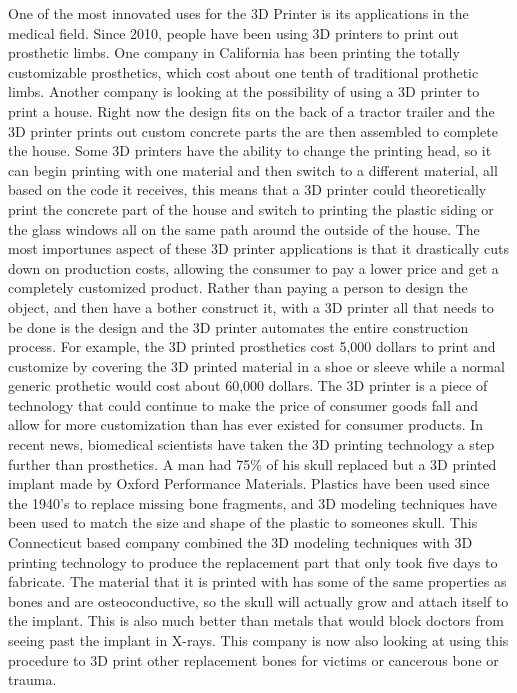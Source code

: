 \documentclass[12pt,twocolumn]{article}
\begin{document}
\indent	One of the most innovated uses for the 3D Printer is its applications in the medical field. Since 2010, people have been using 3D printers to print out prosthetic limbs. One company in California has been printing the totally customizable prosthetics, which cost about one tenth of traditional prothetic limbs. Another company is looking at the possibility of using a 3D printer to print a house. Right now the design fits on the back of a tractor trailer and the 3D printer prints out custom concrete parts the are then assembled to complete the house. Some 3D printers have the ability to change the printing head, so it can begin printing with one material and then switch to a different material, all based on the code it receives, this means that a 3D printer could theoretically print the concrete part of the house and switch to printing the plastic siding or the glass windows all on the same path around the outside of the house. The most importunes aspect of these 3D printer applications is that it drastically cuts down on production costs, allowing the consumer to pay a lower price and get a completely customized product. Rather than paying a person to design the object, and then have a bother construct it, with a 3D printer all that needs to be done is the design and the 3D printer automates the entire construction process. For example, the 3D printed prosthetics cost 5,000 dollars to print and customize by covering the 3D printed material in a shoe or sleeve while a normal generic prothetic would cost about 60,000 dollars.\cite{cite5} The 3D printer is a piece of technology that could continue to make the price of consumer goods fall and allow for more customization than has ever existed for consumer products.
 \indent In recent news, biomedical scientists have taken the 3D printing technology a step further than prosthetics. A man had 75\% of his skull replaced but a 3D printed implant made by Oxford Performance Materials. Plastics have been used since the 1940's to replace missing bone fragments, and 3D modeling techniques have been used to match the size and shape of the plastic to someones skull. This Connecticut based company combined the 3D modeling techniques with 3D printing technology to produce the replacement part that only took five days to fabricate.\cite{cite9} The material that it is printed with has some of the same properties as bones and are osteoconductive, so the skull will actually grow and attach itself to the implant. This is also much better than metals that would block doctors from seeing past the implant in X-rays. This company is now also looking at using this procedure to 3D print other replacement bones for victims or cancerous bone or trauma. \\
\end{document}
